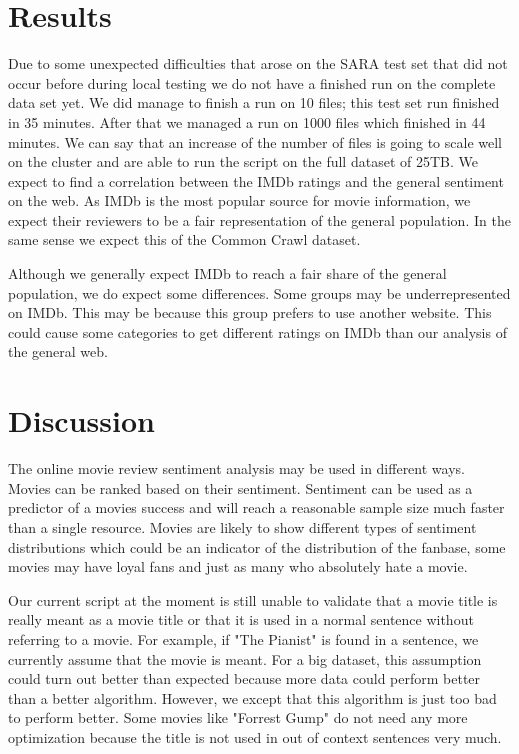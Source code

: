 \documentclass{sig-alternate-br}
\begin{document}
\section{Results}
Due to some unexpected difficulties that arose on the SARA test set that did not occur before during local testing we do not have a finished run on the complete data set yet. We did manage to finish a run on 10 files; this test set run finished in 35 minutes.  After that we managed a run on 1000 files which finished in 44 minutes. We can say that an increase of the number of files is going to scale well on the cluster and are able to run the script on the full dataset of 25TB. We expect to find a correlation between the IMDb ratings and the general sentiment on the web. As IMDb is the most popular source for movie information, we expect their reviewers to be a fair representation of the general population. In the same sense we expect this of the Common Crawl dataset.



Although we generally expect IMDb to reach a fair share of the general population, we do expect some differences. Some groups may be underrepresented on IMDb. This may be because this group prefers to use another website. This could cause some categories to get different ratings on IMDb than our analysis of the general web.



\section{Discussion}
The online movie review sentiment analysis may be used in different ways. Movies can be ranked based on their sentiment. Sentiment can be used as a predictor of a movies success and will reach a reasonable sample size much faster than a single resource. 
Movies are likely to show different types of sentiment distributions which could be an indicator of the distribution of the fanbase, some movies may have loyal fans and just as many who absolutely hate a movie. 

Our current script at the moment is still unable to validate that a movie title is really meant as a movie title or that it is used in a normal sentence without referring to a movie. For example, if "The Pianist" is found in a sentence, we currently assume that the movie is meant. For a big dataset, this assumption could turn out better than expected because more data could perform better than a better algorithm. However, we except that this algorithm is just too bad to perform better. Some movies like "Forrest Gump" do not need any more optimization because the title is not used in out of context sentences very much.
\end{document}
